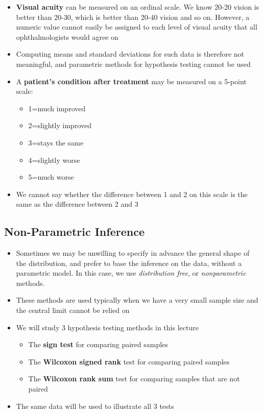 \documentclass[
]{book}
\providecommand{\tightlist}{%
  \setlength{\itemsep}{0pt}\setlength{\parskip}{0pt}}
\begin{document}
\begin{itemize}
\tightlist
\item
  \textbf{Visual acuity} can be measured on an ordinal scale. We know 20-20 vision is better than 20-30, which is better than 20-40 vision and so on. However, a numeric value cannot easily be assigned to each level of visual acuity that all ophthalmologists would agree on
\item
  Computing means and standard deviations for such data is therefore not meaningful, and parametric methods for hypothesis testing cannot be used
\item
  A \textbf{patient's condition after treatment} may be measured on a 5-point scale:

  \begin{itemize}
  \tightlist
  \item
    1=much improved
  \item
    2=slightly improved
  \item
    3=stays the same
  \item
    4=slightly worse
  \item
    5=much worse
  \end{itemize}
\item
  We cannot say whether the difference between 1 and 2 on this scale is the same as the difference between 2 and 3
\end{itemize}

\hypertarget{non-parametric-inference}{%
\subsection{Non-Parametric Inference}\label{non-parametric-inference}}

\begin{itemize}
\tightlist
\item
  Sometimes we may be unwilling to specify in advance the general shape of the distribution, and prefer to base the inference on the data, without a parametric model. In this case, we use \emph{distribution free}, or \emph{nonparametric} methods.
\item
  These methods are used typically when we have a very small sample size and the central limit cannot be relied on
\item
  We will study 3 hypothesis testing methods in this lecture

  \begin{itemize}
  \tightlist
  \item
    The \textbf{sign test} for comparing paired samples
  \item
    The \textbf{Wilcoxon signed rank} test for comparing paired samples
  \item
    The \textbf{Wilcoxon rank sum} test for comparing samples that are not paired
  \end{itemize}
\item
  The same data will be used to illustrate all 3 tests
\end{itemize}
\end{document}
